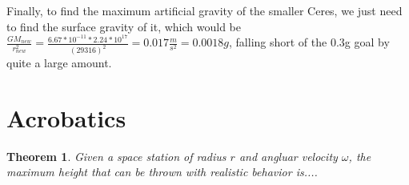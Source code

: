 \documentclass{amsart}
\newtheorem{theorem}{Theorem}[section]
\theoremstyle{definition}
\begin{document}
Finally, to find the maximum artificial gravity of the smaller Ceres, we just need to find the surface gravity of it, which would be \(\frac{GM_{new}}{r_{new}^2}=\frac{6.67*10^{-11}*2.24*10^{17}}{(29316)^2} = 0.017\frac{m}{s^2} = 0.0018g\), falling short of the 0.3g goal by quite a large amount.




\section{Acrobatics}



\begin{theorem}
  Given a space station of radius $r$ and angluar velocity $\omega$, the maximum height that can be thrown with realistic behavior is....
\end{theorem}
\end{document}
